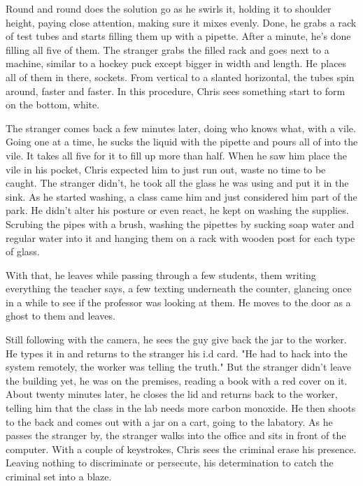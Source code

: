         Round and round does the solution go as he swirls it, holding it to shoulder height, paying close attention, making sure it mixes evenly.
    Done, he grabs a rack of test tubes and starts filling them up with a pipette. After a minute, he's done filling all five of them. The 
    stranger grabs the filled rack and goes next to a machine, similar to a hockey puck except bigger in width and length. He places all of them
    in there, sockets. From vertical to a slanted horizontal, the tubes spin around, faster and faster. In this procedure, Chris sees something
    start to form on the bottom, white.

        The stranger comes back a few minutes later, doing who knows what, with a vile. Going one at a time, he sucks the liquid with the pipette
    and pours all of into the vile. It takes all five for it to fill up more than half. When he saw him place the vile in his pocket, Chris
    expected him to just run out, waste no time to be caught. The stranger didn't, he took all the glass he was using and put it in the sink.
    As he started washing, a class came him and just considered him part of the park. He didn't alter his posture or even react, he kept on
    washing the supplies. Scrubing the pipes with a brush, washing the pipettes by sucking soap water and regular water into it and hanging them
    on a rack with wooden post for each type of glass.

        With that, he leaves while passing through a few students, them writing everything the teacher says, a few texting underneath the counter,
    glancing once in a while to see if the professor was looking at them. He moves to the door as a ghost to them and leaves.

        Still following with the camera, he sees the guy give back the jar to the worker. He types it in and returns to the stranger his i.d
    card. "He had to hack into the system remotely, the worker was telling the truth." But the stranger didn't leave the building yet, he 
    was on the premises, reading a book with a red cover on it. About twenty minutes later, he closes the lid and returns back to the worker,
    telling him that the class in the lab needs more carbon monoxide. He then shoots to the back and comes out with a jar on a cart, going to the
    labatory. As he passes the stranger by, the stranger walks into the office and sits in front of the computer. With a couple of keystrokes,
    Chris sees the criminal erase his presence. Leaving nothing to discriminate or persecute, his determination to catch the criminal set into
    a blaze.

